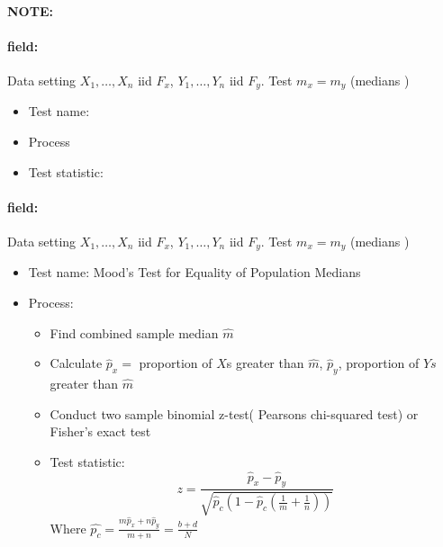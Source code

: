 \documentclass[12pt]{article}
\newenvironment{note}{\paragraph{NOTE:}}{}
\newenvironment{field}{\paragraph{field:}}{}
\begin{document}
\begin{note}
 \begin{field}
  Data setting $X_1, \ldots , X_n$ iid $F_x$, $Y_1, \ldots, Y_n$ iid $F_y$. Test $m_x = m_y$ (medians )
  \begin{itemize}
   \item Test name:
   \item Process
   \item Test statistic:
  \end{itemize}
 \end{field}
 \begin{field}
  Data setting $X_1, \ldots , X_n$ iid $F_x$, $Y_1, \ldots, Y_n$ iid $F_y$. Test $m_x = m_y$ (medians )
  \begin{itemize}
   \item Test name: Mood's Test for Equality of Population Medians
   \item Process:
         \begin{itemize}
          \item Find combined sample median $\hat{m}$
          \item Calculate $\hat{p}_x = $ proportion of $X$s greater than $\hat{m}$, $\hat{p}_y$, proportion of $Ys$ greater than $\hat{m}$
          \item Conduct two sample binomial z-test( Pearsons chi-squared test) or Fisher's exact test
          \item  Test statistic: $$ z = \frac{\hat{p}_x - \hat{p}_y}{\sqrt{\hat{p}_c(1 - \hat{p}_c(\frac{1}{m} + \frac{1}{n}))}} $$ Where $\hat{p_c} = \frac{m\hat{p}_x + n\hat{p}_y}{m+n} = \frac{b + d}{N}$
         \end{itemize}
  \end{itemize}
 \end{field}
\end{note}
\end{document}
